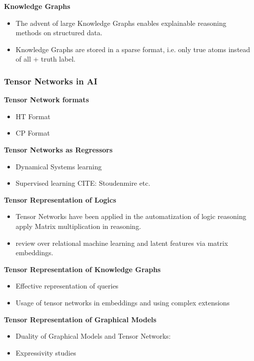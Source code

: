 \textbf{Knowledge Graphs}
\cite{hogan_knowledge_2021}
\begin{itemize}
    \item The advent of large Knowledge Graphs enables explainable reasoning methods on structured data.
    \item Knowledge Graphs are stored in a sparse format, i.e. only true atoms instead of all + truth label.
\end{itemize}


\subsubsection{Tensor Networks in AI}

\textbf{Tensor Network formats}
\begin{itemize}
    \item HT Format \cite{hackbusch_new_2009}
    \item CP Format
\end{itemize}

\textbf{Tensor Networks as Regressors}
\begin{itemize}
    \item Dynamical Systems learning \cite{gels_multidimensional_2019, goesmann_tensor_2020}
    \item Supervised learning CITE: Stoudenmire etc.
\end{itemize}

\textbf{Tensor Representation of Logics}
\begin{itemize}
    \item Tensor Networks have been applied in the automatization of logic reasoning \cite{li_linear_2017, sato_linear_2017} apply Matrix multiplication in reasoning.
    \item \cite{nickel_review_2016} review over relational machine learning and latent features via matrix embeddings.
\end{itemize}

\textbf{Tensor Representation of Knowledge Graphs}
\begin{itemize}
    \item Effective representation of queries
    \item Usage of tensor networks in embeddings \cite{yang_embedding_2015} and using complex extensions \cite{trouillon_complex_2017, trouillon_knowledge_2017}
\end{itemize}

\textbf{Tensor Representation of Graphical Models}
\begin{itemize}
    \item Duality of Graphical Models and Tensor Networks:
    \cite{robeva_duality_2019}
    \item Expressivity studies \cite{glasser_expressive_2019}
\end{itemize}

